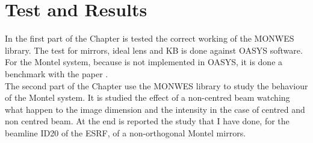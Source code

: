 \chapter{Test and Results}
\label{capitolo4}

\vspace{5cm}

In the first part of the Chapter is tested the correct working of the MONWES library. The test for mirrors, ideal lens and KB is done against OASYS software. For the Montel system, because is not implemented in OASYS, it is done a benchmark with the paper \cite{resta2015nested}.
\\
The second part of the Chapter use the MONWES library to study the behaviour of the Montel system. It is studied the effect of a non-centred beam watching what happen to the image dimension and the intensity in the case of centred and non centred beam. At the end is reported the study that I have done, for the beamline ID20 of the ESRF, of a non-orthogonal Montel mirrors.
\vspace{0.5cm}
